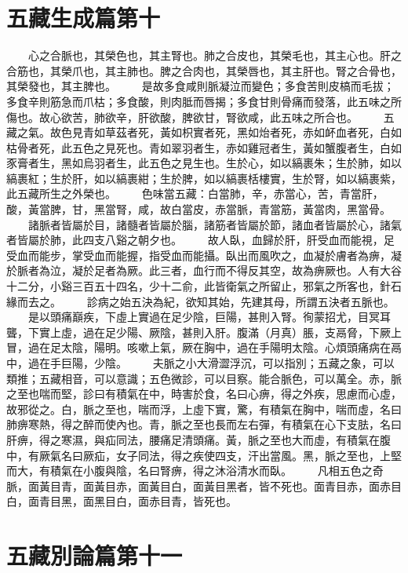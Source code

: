\section{五藏生成篇第十}

　　心之合脈也，其榮色也，其主腎也。肺之合皮也，其榮毛也，其主心也。肝之合筋也，其榮爪也，其主肺也。脾之合肉也，其榮唇也，其主肝也。腎之合骨也，其榮發也，其主脾也。
　　是故多食咸則脈凝泣而變色；多食苦則皮槁而毛拔；多食辛則筋急而爪枯；多食酸，則肉胝而唇揭；多食甘則骨痛而發落，此五味之所傷也。故心欲苦，肺欲辛，肝欲酸，脾欲甘，腎欲咸，此五味之所合也。
　　五藏之氣。故色見青如草茲者死，黃如枳實者死，黑如炲者死，赤如衃血者死，白如枯骨者死，此五色之見死也。青如翠羽者生，赤如雞冠者生，黃如蟹腹者生，白如豕膏者生，黑如烏羽者生，此五色之見生也。生於心，如以縞裹朱；生於肺，如以縞裹紅；生於肝，如以縞裹紺；生於脾，如以縞裹栝樓實，生於腎，如以縞裹紫，此五藏所生之外榮也。
　　色味當五藏：白當肺，辛，赤當心，苦，青當肝，酸，黃當脾，甘，黑當腎，咸，故白當皮，赤當脈，青當筋，黃當肉，黑當骨。
　　諸脈者皆屬於目，諸髓者皆屬於腦，諸筋者皆屬於節，諸血者皆屬於心，諸氣者皆屬於肺，此四支八谿之朝夕也。
　　故人臥，血歸於肝，肝受血而能視，足受血而能步，掌受血而能握，指受血而能攝。臥出而風吹之，血凝於膚者為痹，凝於脈者為泣，凝於足者為厥。此三者，血行而不得反其空，故為痹厥也。人有大谷十二分，小谿三百五十四名，少十二俞，此皆衛氣之所留止，邪氣之所客也，針石緣而去之。
　　診病之始五決為紀，欲知其始，先建其母，所謂五決者五脈也。
　　是以頭痛巔疾，下虛上實過在足少陰，巨陽，甚則入腎。徇蒙招尤，目冥耳聾，下實上虛，過在足少陽、厥陰，甚則入肝。腹滿（月真）脹，支鬲脅，下厥上冒，過在足太陰，陽明。咳嗽上氣，厥在胸中，過在手陽明太陰。心煩頭痛病在鬲中，過在手巨陽，少陰。
　　夫脈之小大滑澀浮沉，可以指別；五藏之象，可以類推；五藏相音，可以意識；五色微診，可以目察。能合脈色，可以萬全。赤，脈之至也喘而堅，診曰有積氣在中，時害於食，名曰心痹，得之外疾，思慮而心虛，故邪從之。白，脈之至也，喘而浮，上虛下實，驚，有積氣在胸中，喘而虛，名曰肺痹寒熱，得之醉而使內也。青，脈之至也長而左右彈，有積氣在心下支胠，名曰肝痹，得之寒濕，與疝同法，腰痛足清頭痛。黃，脈之至也大而虛，有積氣在腹中，有厥氣名曰厥疝，女子同法，得之疾使四支，汗出當風。黑，脈之至也，上堅而大，有積氣在小腹與陰，名曰腎痹，得之沐浴清水而臥。
　　凡相五色之奇脈，面黃目青，面黃目赤，面黃目白，面黃目黑者，皆不死也。面青目赤，面赤目白，面青目黑，面黑目白，面赤目青，皆死也。


\section{五藏別論篇第十一}

